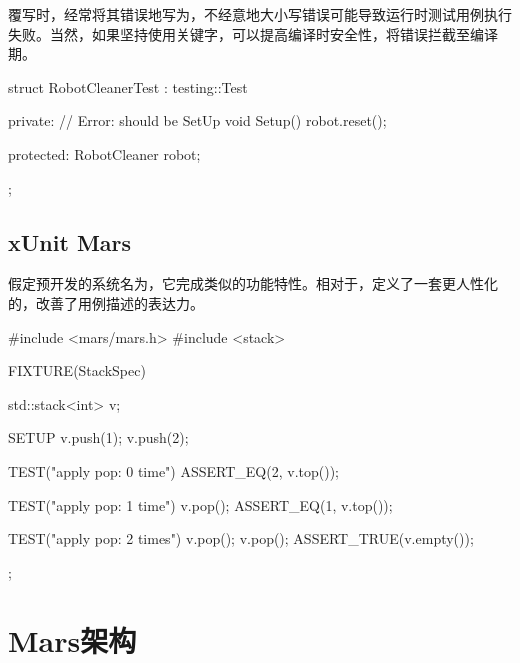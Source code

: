 \begin{content}
覆写时，经常将其错误地写为，不经意地大小写错误可能导致运行时测试用例执行失败。当然，如果坚持使用关键字，可以提高编译时安全性，将错误拦截至编译期。

\begin{leftbar}
 \begin{c++}[caption={\ttfamily{错误：本应该声明为SetUp，而错误地声明为Setup}}]
struct RobotCleanerTest : testing::Test {
private:
  // Error: should be SetUp
  void Setup() {
    robot.reset();
  }
 
protected:
  RobotCleaner robot;
};
  \end{c++}
\end{leftbar}

\subsection{xUnit Mars}

假定预开发的系统名为，它完成类似的功能特性。相对于，定义了一套更人性化的，改善了用例描述的表达力。

\begin{enum}
\end{enum}

\begin{leftbar}
 \begin{c++}[caption={\ttfamily{xUnit Mars样例}}]
#include <mars/mars.h>
#include <stack>

FIXTURE(StackSpec) {
  std::stack<int> v;   

  SETUP {
    v.push(1);
    v.push(2);
  }

  TEST("apply pop: 0 time") {
    ASSERT_EQ(2, v.top());
  }

  TEST("apply pop: 1 time") {
    v.pop();
    ASSERT_EQ(1, v.top());
  }

  TEST("apply pop: 2 times") {
    v.pop();
    v.pop();
    ASSERT_TRUE(v.empty());
  }
}; 
 \end{c++}
\end{leftbar}

\end{content}

\section{Mars架构}
	
